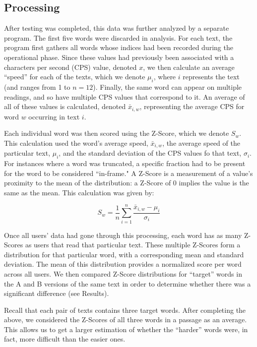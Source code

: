 \documentclass[11pt,letterpaper]{article}
\begin{document}
	\subsection{Processing}
	
	After testing was completed, this data was further analyzed by a separate program. The first five words were discarded in analysis. For each text, the program first gathers all words whose indices had been recorded during the operational phase. Since these values had previously been associated with a characters per second (CPS) value, denoted $x$, we then calculate an average ``speed'' for each of the texts, which we denote $\mu_i$, where $i$ represents the text (and ranges from 1 to $n=12$). Finally, the same word can appear on multiple readings, and so have multiple CPS values that correspond to it. An average of all of these values is calculated, denoted $\bar{x}_{i,w}$, representing the average CPS for word $w$ occurring in text $i$.
	
	Each individual word was then scored using the Z-Score, which we denote $S_w$. This calculation used the word's average speed, $\bar{x}_{i,w}$, the average speed of the particular text, $\mu_i$, and the standard deviation of the CPS values fo that text, $\sigma_i$. For instances where a word was truncated, a specific fraction had to be present for the word to be considered ``in-frame." A Z-Score is a measurement of a value's proximity to the mean of the distribution: a Z-Score of 0 implies the value is the same as the mean. This calculation was given by:
	
	\[ S_w = \frac1n \sum_{i=1}^n \frac{\bar{x}_{i,w} - \mu_i}{\sigma_i} \]
	
	Once all users' data had gone through this processing, each word has as many Z-Scores as users that read that particular text. These multiple Z-Scores form a distribution for that particular word, with a corresponding mean and standard deviation. The mean of this distribution provides a normalized score per word across all users. We then compared Z-Score distributions for ``target'' words in the A and B versions of the same text in order to determine whether there was a significant difference (see Results). 
	
	Recall that each pair of texts contains three target words. After completing the above, we considered the Z-Scores of all three words in a passage as an average. This allows us to get a larger estimation of whether the ``harder'' words were, in fact, more difficult than the easier ones.
	
\end{document}
